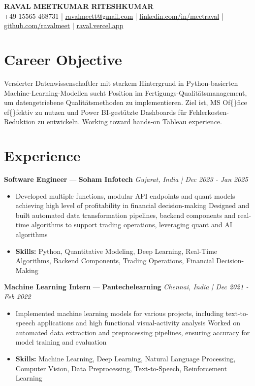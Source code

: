 \documentclass[a4paper,10pt]{article}
\begin{document}
\begin{center}
  {\Large\bfseries RAVAL MEETKUMAR RITESHKUMAR}\\[2pt]
  {\small +49 15565 468731 \;|\; \href{mailto:ravalmeett@gmail.com}{ravalmeett@gmail.com} \;|\; \href{https://www.linkedin.com/in/meetraval/}{linkedin.com/in/meetraval} \;|\; \href{https://github.com/ravalmeet}{github.com/ravalmeet} \;|\; \href{https://raval.vercel.app/}{raval.vercel.app}}
\end{center}
\vspace{-3pt}

\section*{Career Objective}
Versierter Datenwissenschaftler mit starkem Hintergrund in Python-basierten Machine-Learning-Modellen sucht Position im Fertigungs-Qualitätsmanagement, um datengetriebene Qualitätsmethoden zu implementieren. Ziel ist, MS Of\{\}fice ef\{\}fektiv zu nutzen und Power BI-gestützte Dashboards für Fehlerkosten-Reduktion zu entwickeln. Working toward hands-on Tableau experience.\par

\section*{Experience}
\textbf{Software Engineer} — \textbf{Soham Infotech} \hfill \textit{Gujarat, India \;|\; Dec 2023 - Jan 2025}\par
\vspace{1pt}
\begin{itemize}
  \item Developed multiple functions, modular API endpoints and quant models achieving high level of profitability in financial decision-making Designed and built automated data transformation pipelines, backend components and real-time algorithms to support trading operations, leveraging quant and AI algorithms
  \item \textbf{Skills:} Python, Quantitative Modeling, Deep Learning, Real-Time Algorithms, Backend Components, Trading Operations, Financial Decision-Making
\end{itemize}
\vspace{3pt}
\textbf{Machine Learning Intern} — \textbf{Pantechelearning} \hfill \textit{Chennai, India \;|\; Dec 2021 - Feb 2022}\par
\vspace{1pt}
\begin{itemize}
  \item Implemented machine learning models for various projects, including text-to-speech applications and high functional visual-activity analysis Worked on automated data extraction and preprocessing pipelines, ensuring accuracy for model training and evaluation
  \item \textbf{Skills:} Machine Learning, Deep Learning, Natural Language Processing, Computer Vision, Data Preprocessing, Text-to-Speech, Reinforcement Learning
\end{itemize}
\end{document}
